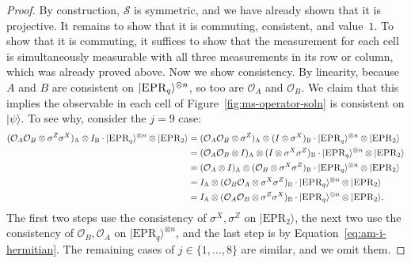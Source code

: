 \documentclass[11pt]{article}
\theoremstyle{definition}
\newcommand{\ket}[1]{|#1\rangle}
\newcommand{\strategy}{\mathscr{S}}
\newcommand{\labelstyle}[1]{\ensuremath{\textsc{#1}}\xspace}
\newcommand{\EPR}{\labelstyle{EPR}}
\newcommand{\alice}{\labelstyle{A}}
\newcommand{\bob}{\labelstyle{B}}
\renewcommand{\cal}[1]{\mathcal{#1}}
\begin{document}
\begin{proof}
  By construction, $\strategy$ is symmetric, and we have already shown that it is projective.
  It remains to show that it is commuting, consistent, and value~$1$.
  To show that it is commuting,
  it suffices to show that the measurement for each cell
  is simultaneously measurable with all three measurements in its row or column,
  which was already proved above.
  Now we show consistency.
  By linearity, because $A$ and $B$ are consistent on $\ket{\EPR_q}^{\otimes n}$,
  so too are $\cal{O}_A$ and $\cal{O}_B$.
  We claim that this implies the observable in each cell of Figure~\ref{fig:ms-operator-soln} is consistent on $\ket{\psi}$.
  To see why, consider the $j = 9$ case:
  \begin{align*}
  (\cal{O}_A \cal{O}_B \otimes \sigma^Z \sigma^X)_\alice \otimes I_\bob \cdot \ket{\EPR_q}^{\otimes n} \otimes \ket{\EPR_2}
  &= (\cal{O}_A \cal{O}_B \otimes \sigma^Z)_\alice \otimes (I \otimes \sigma^X)_\bob
  		\cdot \ket{\EPR_q}^{\otimes n} \otimes \ket{\EPR_2}\\
  &= (\cal{O}_A \cal{O}_B \otimes I)_\alice \otimes (I \otimes \sigma^X\sigma^Z)_\bob
  		\cdot \ket{\EPR_q}^{\otimes n} \otimes \ket{\EPR_2}\\
  &= (\cal{O}_A \otimes I)_\alice \otimes ( \cal{O}_B \otimes \sigma^X\sigma^Z)_\bob
  		\cdot \ket{\EPR_q}^{\otimes n} \otimes \ket{\EPR_2}\\
  &= I_\alice \otimes (\cal{O}_B \cal{O}_A \otimes \sigma^X\sigma^Z)_\bob
  		\cdot \ket{\EPR_q}^{\otimes n} \otimes \ket{\EPR_2}\\
  &= I_\alice \otimes (\cal{O}_A \cal{O}_B \otimes \sigma^Z \sigma^X)_\bob
  		\cdot \ket{\EPR_q}^{\otimes n} \otimes \ket{\EPR_2}.
  \end{align*}
  The first two steps use the consistency of $\sigma^X, \sigma^Z$ on $\ket{\mathrm{EPR}_2}$,
  the next two use the consistency of $\cal{O}_B, \cal{O}_A$ on $\ket{\mathrm{EPR}_q}^{\otimes n}$,
  and the last step is by Equation~\eqref{eq:am-i-hermitian}.
  The remaining cases of $j \in\{1, \ldots, 8\}$ are similar, and we omit them.
  

\end{proof}
\end{document}
